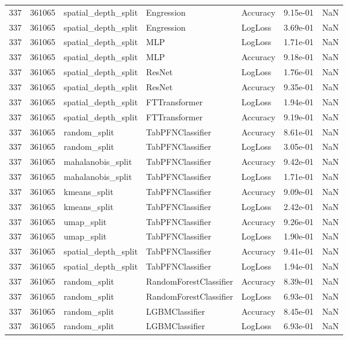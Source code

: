 \begin{tabular}{rrlllrr}
337 & 361065 & spatial\_depth\_split & Engression & Accuracy & 9.15e-01 & NaN \\
337 & 361065 & spatial\_depth\_split & Engression & LogLoss & 3.69e-01 & NaN \\
337 & 361065 & spatial\_depth\_split & MLP & LogLoss & 1.71e-01 & NaN \\
337 & 361065 & spatial\_depth\_split & MLP & Accuracy & 9.18e-01 & NaN \\
337 & 361065 & spatial\_depth\_split & ResNet & LogLoss & 1.76e-01 & NaN \\
337 & 361065 & spatial\_depth\_split & ResNet & Accuracy & 9.35e-01 & NaN \\
337 & 361065 & spatial\_depth\_split & FTTransformer & LogLoss & 1.94e-01 & NaN \\
337 & 361065 & spatial\_depth\_split & FTTransformer & Accuracy & 9.19e-01 & NaN \\
337 & 361065 & random\_split & TabPFNClassifier & Accuracy & 8.61e-01 & NaN \\
337 & 361065 & random\_split & TabPFNClassifier & LogLoss & 3.05e-01 & NaN \\
337 & 361065 & mahalanobis\_split & TabPFNClassifier & Accuracy & 9.42e-01 & NaN \\
337 & 361065 & mahalanobis\_split & TabPFNClassifier & LogLoss & 1.71e-01 & NaN \\
337 & 361065 & kmeans\_split & TabPFNClassifier & Accuracy & 9.09e-01 & NaN \\
337 & 361065 & kmeans\_split & TabPFNClassifier & LogLoss & 2.42e-01 & NaN \\
337 & 361065 & umap\_split & TabPFNClassifier & Accuracy & 9.26e-01 & NaN \\
337 & 361065 & umap\_split & TabPFNClassifier & LogLoss & 1.90e-01 & NaN \\
337 & 361065 & spatial\_depth\_split & TabPFNClassifier & Accuracy & 9.41e-01 & NaN \\
337 & 361065 & spatial\_depth\_split & TabPFNClassifier & LogLoss & 1.94e-01 & NaN \\
337 & 361065 & random\_split & RandomForestClassifier & Accuracy & 8.39e-01 & NaN \\
337 & 361065 & random\_split & RandomForestClassifier & LogLoss & 6.93e-01 & NaN \\
337 & 361065 & random\_split & LGBMClassifier & Accuracy & 8.45e-01 & NaN \\
337 & 361065 & random\_split & LGBMClassifier & LogLoss & 6.93e-01 & NaN \\

\end{tabular}
